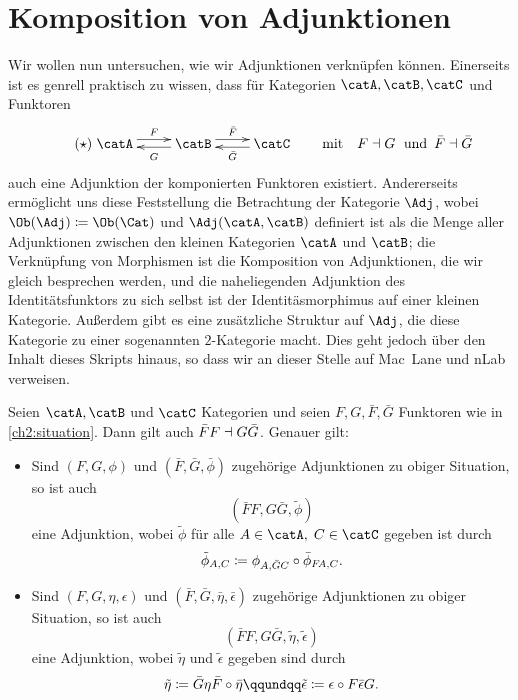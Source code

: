 \chapter{Komposition von Adjunktionen}
Wir wollen nun untersuchen, wie wir Adjunktionen verknüpfen können. Einerseits
ist es genrell praktisch zu wissen, dass für Kategorien $\catA,\catB,\catC$ und
Funktoren
\vspace{-1mm}
\[ \tag{$\star$} \label{ch2:situation}
    \xymatrix{ \catA \ar@<3.5pt>[r]^F & \ar@<2pt>[l]^{G\vphantom{\bar G}} \catB 
    \ar@<3.5pt>[r]^{\bar F} & \ar@<2pt>[l]^{\bar G} \catC
    }
    \qquad\text{mit}\quad 
    F\leftadjoint G \text{\; und \,} \bar F\leftadjoint\bar G
\]
auch eine Adjunktion der komponierten Funktoren existiert. Andererseits
ermöglicht uns diese Feststellung die Betrachtung der Kategorie $\Adj$, wobei
$\Ob(\Adj)\defeq\Ob(\Cat)$ und $\Adj(\catA,\catB)$ definiert ist als die 
Menge aller Adjunktionen %
zwischen den kleinen Kategorien $\catA$ und $\catB$;
die Verknüpfung von Morphismen ist die Komposition von Adjunktionen, die wir 
gleich besprechen werden, und die naheliegenden Adjunktion des
Identitätsfunktors zu sich selbst ist der Identitäsmorphimus auf einer kleinen
Kategorie. Außerdem gibt es eine zusätzliche Struktur auf $\Adj$, die diese
Kategorie zu einer sogenannten $2$-Kategorie macht. Dies geht jedoch über den
Inhalt dieses Skripts hinaus, so dass wir an dieser Stelle auf 
Mac~Lane\cite[\S\,IV.8,\;\S\,XII.3]{bookc:maclane97} und 
nLab\cite{www:nlab:2category} verweisen.

\begin{thProposition}
    Seien $\catA,\catB$ und $\catC$ Kategorien und seien $F,G,\bar F,\bar G$
    Funktoren wie in \eqref{ch2:situation}.
    Dann gilt auch $\bar F F \dashv G\bar G$.
    Genauer gilt:
    \begin{itemize}
        \item
            Sind $(F,G,\phi)$ und $(\bar F,\bar G,\bar\phi)$ zugehörige
            Adjunktionen zu obiger Situation, so ist auch
            \[ (\bar F F, G\bar G, \tilde\phi) \]  
            eine Adjunktion, wobei $\tilde\phi$ für alle 
            $A\in\catA,\; C\in\catC$ gegeben ist durch
            \[ \tilde\phi_{A,C} \defeq 
                \phi_{A,\bar GC} \after \bar\phi_{F\!A,C}
            . \]

        \item
            Sind $(F,G,\eta,\epsilon)$ und $(\bar F, \bar G, \bar\eta,
            \bar\epsilon)$ zugehörige Adjunktionen zu obiger Situation, so ist
            auch
            \[ (\bar F F, G\bar G, \tilde\eta, \tilde\epsilon) \]
            eine Adjunktion, wobei $\tilde\eta$ und $\tilde\epsilon$ gegeben
            sind durch
            \[ \tilde\eta \defeq \bar G\eta\bar F \after \bar\eta
                \qqundqq
                \tilde\epsilon \defeq \epsilon \after F\bar\epsilon G
            . \]
    \end{itemize}
\end{thProposition}
